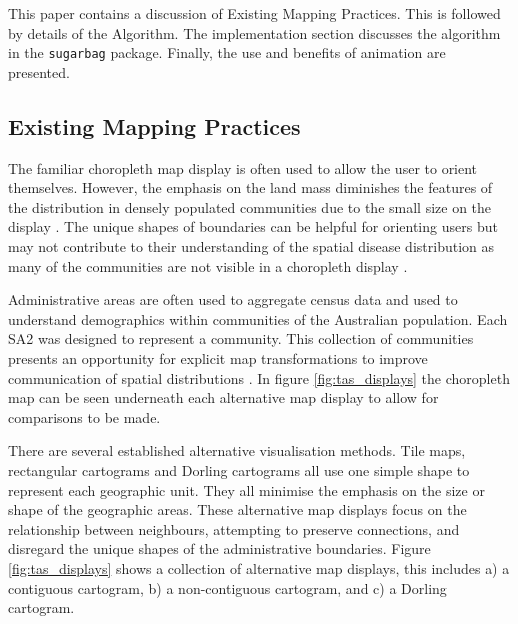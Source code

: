 This paper contains a discussion of Existing Mapping Practices. This is
followed by details of the Algorithm. The implementation section
discusses the algorithm in the \texttt{sugarbag} package. Finally, the
use and benefits of animation are presented.

\hypertarget{existing-mapping-practices}{%
\subsection{Existing Mapping
Practices}\label{existing-mapping-practices}}

The familiar choropleth map display is often used to allow the user to
orient themselves. However, the emphasis on the land mass diminishes the
features of the distribution in densely populated communities due to the
small size on the display \citep{ACTUC}. The unique shapes of boundaries
can be helpful for orienting users but may not contribute to their
understanding of the spatial disease distribution as many of the
communities are not visible in a choropleth display \citep{TVSSS}.

Administrative areas are often used to aggregate census data and used to
understand demographics within communities of the Australian population.
Each SA2 \citep{abs2011} was designed to represent a community. This
collection of communities presents an opportunity for explicit map
transformations to improve communication of spatial distributions
\citep{CBATCC}. In figure \ref{fig:tas_displays} the choropleth map can
be seen underneath each alternative map display to allow for comparisons
to be made.

There are several established alternative visualisation methods. Tile
maps, rectangular cartograms \citep{ORC} and Dorling cartograms
\citep{ACTUC} all use one simple shape to represent each geographic
unit. They all minimise the emphasis on the size or shape of the
geographic areas. These alternative map displays focus on the
relationship between neighbours, attempting to preserve connections, and
disregard the unique shapes of the administrative boundaries. Figure
\ref{fig:tas_displays} shows a collection of alternative map displays,
this includes a) a contiguous cartogram, b) a non-contiguous cartogram,
and c) a Dorling cartogram.

